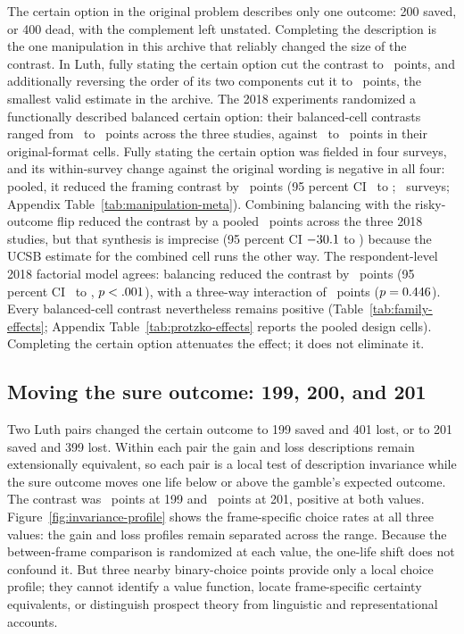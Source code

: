 \documentclass[11pt]{article}
\begin{document}
The certain option in the original problem describes only one outcome: 200 saved, or 400 dead, with the complement left unstated. Completing the description is the one manipulation in this archive that reliably changed the size of the contrast. In Luth, fully stating the certain option cut the contrast to \LuthArmBalancedEffect\ points, and additionally reversing the order of its two components cut it to \LuthArmBalancedReversedEffect\ points, the smallest valid estimate in the archive. The 2018 experiments randomized a functionally described balanced certain option: their balanced-cell contrasts ranged from \ProtzkoBalancedMin\ to \ProtzkoBalancedMax\ points across the three studies, against \ProtzkoOriginalMin\ to \ProtzkoOriginalMax\ points in their original-format cells. Fully stating the certain option was fielded in four surveys, and its within-survey change against the original wording is negative in all four: pooled, it reduced the framing contrast by \BalancedAttenuation\ points (95 percent CI \BalancedAttenuationLow\ to \BalancedAttenuationHigh; \BalancedChangeK\ surveys; Appendix Table~\ref{tab:manipulation-meta}). Combining balancing with the risky-outcome flip reduced the contrast by a pooled \BalancedFlipAttenuation\ points across the three 2018 studies, but that synthesis is imprecise (95 percent CI $-30.1$ to \BalancedFlipAttenuationHigh) because the UCSB estimate for the combined cell runs the other way. The respondent-level 2018 factorial model agrees: balancing reduced the contrast by \ProtzkoExplicitAttenuation\ points (95 percent CI \ProtzkoExplicitAttenuationLow\ to \ProtzkoExplicitAttenuationHigh, $p<.001$), with a three-way interaction of \ProtzkoThreeWay\ points ($p=0.446$). Every balanced-cell contrast nevertheless remains positive (Table~\ref{tab:family-effects}; Appendix Table~\ref{tab:protzko-effects} reports the pooled design cells). Completing the certain option attenuates the effect; it does not eliminate it.

\subsection{Moving the sure outcome: 199, 200, and 201}

Two Luth pairs changed the certain outcome to 199 saved and 401 lost, or to 201 saved and 399 lost. Within each pair the gain and loss descriptions remain extensionally equivalent, so each pair is a local test of description invariance while the sure outcome moves one life below or above the gamble's expected outcome. The contrast was \LuthArmLowerEffect\ points at 199 and \LuthArmUpperEffect\ points at 201, positive at both values. Figure~\ref{fig:invariance-profile} shows the frame-specific choice rates at all three values: the gain and loss profiles remain separated across the range. Because the between-frame comparison is randomized at each value, the one-life shift does not confound it. But three nearby binary-choice points provide only a local choice profile; they cannot identify a value function, locate frame-specific certainty equivalents, or distinguish prospect theory from linguistic and representational accounts.
\end{document}
